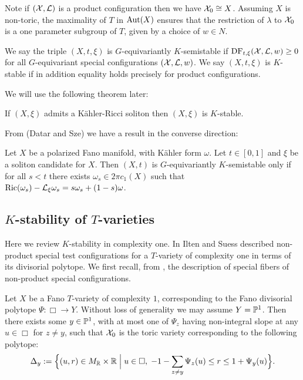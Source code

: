 Note if \(({\mathcal{X}},\mathcal{L})\) is a product configuration then we have \({\mathcal{X}}_0 \cong X\). Assuming \(X\) is non-toric, the maximality of \(T\) in \(\mathop{\rm Aut}\nolimits(X)\) ensures that the restriction of \(\lambda\) to \({\mathcal{X}}_0\) is a one parameter subgroup of \(T\), given by a choice of \(w \in N\).
\begin{definition}
We say the triple  \((X,t,\xi)\) is \(G\)-equivariantly \(K\)-semistable if \( \mathop{\rm DF}\nolimits_{t,\xi}({\mathcal{X}},\mathcal{L},w) \ge 0\) for all \(G\)-equivariant special configurations \(({\mathcal{X}},\mathcal{L},w)\). We say \((X,t,\xi)\) is \(K\)-stable if in addition equality holds precisely for product configurations. 
\end{definition}
We will use the following theorem later:
\begin{theorem} \label{thm:BWN}
If \((X,\xi)\) admits a K\"ahler-Ricci soliton then \((X,\xi)\) is \(K\)-stable.
\end{theorem}
From (Datar and Sze) we have a result in the converse direction:
\begin{theorem} \label{thm:DS}
Let \(X\) be a polarized Fano manifold, with K\"ahler form \(\omega\). Let \(t \in [0,1]\) and \(\xi\) be a soliton candidate for \(X\). Then \((X,t)\) is \(G\)-equivariantly \(K\)-semistable only if for all \(s <t\)  there exists \(\omega_s \in 2 \pi c_1(X)\) such that \(\mathop{\rm Ric}\nolimits(\omega_s) - \mathcal{L}_\xi \omega_s = s \omega_s + (1-s) \omega\).
\end{theorem}
\subsection{$K$-stability of $T$-varieties} \label{subsec:IS}
Here we review \(K\)-stability in complexity one. In \cite{ilten2015} Ilten and Suess described non-product special test configurations for a \(T\)-variety of complexity one in terms of its divisorial polytope. We first recall, from \cite{ilten2015}, the description of special fibers of non-product special configurations.

Let \(X\) be a Fano \(T\)-variety of complexity \(1\), corresponding to the Fano divisorial polytope \(\Psi : \Box \to Y\). Without loss of generality we may assume \(Y = \mathbb{P}^1\). Then there exists some \(y \in \mathbb{P}^1\), with at most one of \(\Psi_z\) having non-integral slope at any \(u \in \Box\) for \(z \neq y\), such that \({\mathcal{X}}_0\) is the toric variety corresponding to the following polytope:
\begin{equation*}
\Delta_y := \Big\{(u,r) \in M_{\mathbb{R}} \times \mathbb{R} \; \Big| \; u \in \Box,\; -1-\sum_{z \neq y} \Psi_z(u) \leq r \leq 1+\Psi_y(u)\Big\}.\label{eq:special-fibre}
\end{equation*}

